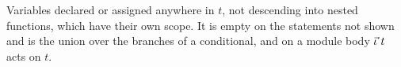 Variables declared or assigned anywhere in $t$, not descending into nested functions, which have their own scope. It is empty on the statements not shown and is the union over the branches of a
conditional, and on a module body $\seq{\iota}\;t$ acts on $t$.
